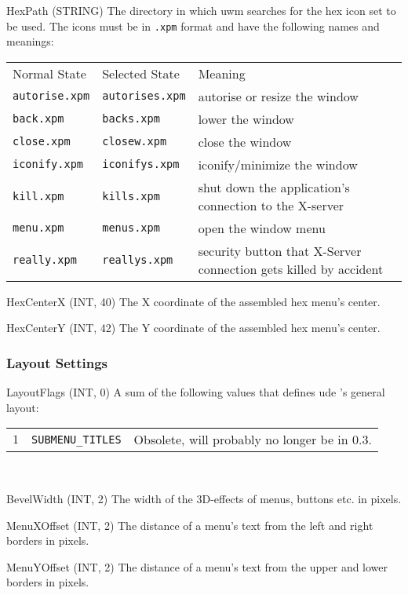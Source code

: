 \documentclass[10pt,a4paper]{article}
\newcommand{\uwm}{{\sc uwm} }
\newcommand{\ude}{{\sc ude} }
\newenvironment{ttdesc}[1]{
   \begin{list}{}{
          \renewcommand{\makelabel}[1]{\texttt{##1\hfill}}}}{\end{list}}
\begin{document}
\begin{ttdesc}{description}
\item[HexPath (STRING)] The directory in which \uwm searches for the hex icon
set to be used. The icons must be in \texttt{.xpm} format and have the
following names and meanings:\\[\smallskipamount]
\begin{tabular}{llp{5cm}}
Normal State & Selected State & Meaning\\
\texttt{autorise.xpm} & \texttt{autorises.xpm} & autorise or resize the
window\\
\texttt{back.xpm} & \texttt{backs.xpm} & lower the window \\
\texttt{close.xpm} & \texttt{closew.xpm} & close the window \\
\texttt{iconify.xpm} & \texttt{iconifys.xpm}& iconify/minimize the window\\
\texttt{kill.xpm} & \texttt{kills.xpm} & shut down the application's
connection to the X-server \\
\texttt{menu.xpm} & \texttt{menus.xpm} & open the window menu\\
\texttt{really.xpm} & \texttt{reallys.xpm} & security button that X-Server
connection gets killed by accident \\
\end{tabular}

\item[HexCenterX (INT, 40)] The X coordinate of the assembled hex menu's
center.
\item[HexCenterY (INT, 42)] The Y coordinate of the assembled hex menu's
center.
\end{ttdesc}

\subsubsection{Layout Settings}
\begin{ttdesc}{description}
\item[LayoutFlags (INT, 0)] A sum of the following values that defines \ude's
general layout:\\[\smallskipamount]
\begin{tabular}{rlp{7cm}}
$1$  & \texttt{SUBMENU\_TITLES} & Obsolete, will probably no longer be in
0.3.\\
\end{tabular}\\

\item[BevelWidth (INT, 2)] The width of the 3D-effects of menus, buttons etc.
in pixels.
\item[MenuXOffset (INT, 2)] The distance of a menu's text from the left and
right borders in pixels.
\item[MenuYOffset (INT, 2)] The distance of a menu's text from the upper and
lower borders in pixels.
\end{ttdesc}
\end{document}

